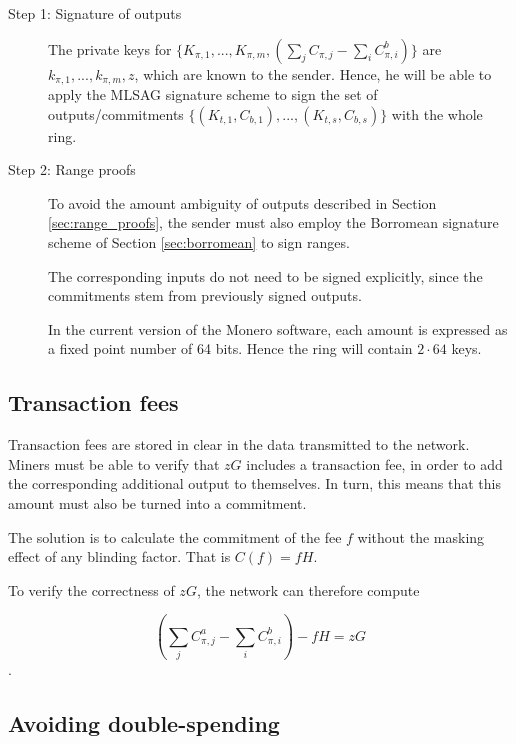 \begin{description}
	
	\item [Step 1: Signature of outputs]
	The private keys for 
	\(\{K_{\pi, 1}, ..., K_{\pi, m}, (\sum\limits_j C_{\pi, j} - \sum\limits_i C^b_{\pi,i})\}\)
	are \(k_{\pi, 1}, ..., k_{\pi, m}, z\), which are known to the sender. 
	Hence, he will be able to apply the MLSAG
	signature scheme to sign the set of outputs/commitments 
	\(\{ (K_{t, 1}, C_{b, 1}), ..., (K_{t, s}, C_{b, s}) \}\) with the whole ring.
	
	\item[Step 2: Range proofs]
	To avoid the amount ambiguity of outputs described in Section \ref{sec:range_proofs}, the sender must also employ the Borromean signature scheme of Section \ref{sec:borromean} to sign ranges.
	
	The corresponding inputs do not need to be signed explicitly, since the commitments stem from previously signed outputs.
	
	In the current version of the Monero software, each amount is expressed as a fixed point number of 64 bits.
	Hence the ring will contain \(2\cdot 64\) keys.
	
	
	
	
\end{description}


\subsection{Transaction fees}

Transaction fees are stored in clear in the data transmitted to the network.
Miners must be able to verify that \(z G\) includes a transaction fee, in order to add
the corresponding additional output to themselves.
In turn, this means that this amount must also be turned into a commitment.

The solution is to calculate the commitment of the fee \(f\) without the masking effect of any blinding factor. That is \(C(f) = f H\).

To verify the correctness of \(zG\), the network can therefore compute

\[ (\sum\limits_j C^a_{\pi, j} - \sum\limits_i C^b_{\pi,i}) - f H = z G \].



\subsection{Avoiding double-spending}

